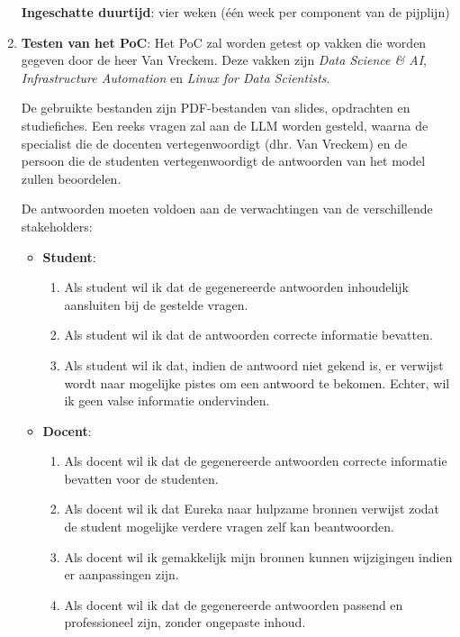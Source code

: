 \begin{enumerate}
    \textbf{Ingeschatte duurtijd}: vier weken (één week per component van de pijplijn)
    
    \item \textbf{Testen van het PoC}: Het PoC zal worden getest op vakken die worden gegeven door de heer Van Vreckem. Deze vakken zijn \textit{Data Science \& AI}, \textit{Infrastructure Automation} en \textit{Linux for Data Scientists}.
    
    De gebruikte bestanden zijn PDF-bestanden van slides, opdrachten en studiefiches. Een reeks vragen zal aan de \acrshort{LLM} worden gesteld, waarna de specialist die de docenten vertegenwoordigt (dhr. Van Vreckem) en de persoon die de studenten vertegenwoordigt de antwoorden van het model zullen beoordelen.
    
    De antwoorden moeten voldoen aan de verwachtingen van de verschillende stakeholders:
    
    \begin{itemize} 
        \item \textbf{Student}:
        \begin{enumerate} 
            \item Als student wil ik dat de gegenereerde antwoorden inhoudelijk aansluiten bij de gestelde vragen.
            \item Als student wil ik dat de antwoorden correcte informatie bevatten. 
            \item Als student wil ik dat, indien de antwoord niet gekend is, er verwijst wordt naar mogelijke pistes om een antwoord te bekomen. Echter, wil ik geen valse informatie ondervinden.
        \end{enumerate}
        \item \textbf{Docent}:
        \begin{enumerate} 
            \item Als docent wil ik dat de gegenereerde antwoorden correcte informatie bevatten voor de studenten.
            \item Als docent wil ik dat Eureka naar hulpzame bronnen verwijst zodat de student mogelijke verdere vragen zelf kan beantwoorden. 
            \item Als docent wil ik gemakkelijk mijn bronnen kunnen wijzigingen indien er aanpassingen zijn.
            \item Als docent wil ik dat de gegenereerde antwoorden passend en professioneel zijn, zonder ongepaste inhoud.
        \end{enumerate}    
    \end{itemize}
    

\end{enumerate}
